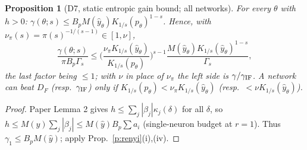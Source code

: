 \documentclass[11pt]{article}
\newtheorem{proposition}{Proposition}[section]\newtheorem{lemma}[proposition]{Lemma}\newtheorem{corollary}[proposition]{Corollary}
\theoremstyle{remark}\newtheorem{remark}[proposition]{Remark}
\begin{document}
\begin{proposition}[D7, static entropic gain bound; all networks]\label{p:gain}
For every $\theta$ with $h>0$: $\gamma(\theta;s)\le B_pM(\hat y_\theta)K_{1/s}(p_\theta)^{1-s}$. Hence, with $\nu_\pi(s)=\pi(s)^{-1/(s-1)}\in[1,\nu]$,
\[\frac{\gamma(\theta;s)}{\pi B_p\Gamma_s}\le\Big(\frac{\nu_\pi K_{1/s}(\hat y_\theta)}{K_{1/s}(p_\theta)}\Big)^{s-1}\frac{M(\hat y_\theta)K_{1/s}(\hat y_\theta)^{1-s}}{\Gamma_s},\]
the last factor being $\le1$; with $\nu$ in place of $\nu_\pi$ the left side is $\gamma/\gamma_{\rm IF}$. A network can beat $D_F$ (resp.\ $\gamma_{\rm IF}$) only if
$K_{1/s}(p_\theta)<\nu_\pi K_{1/s}(\hat y_\theta)$ (resp.\ $<\nu K_{1/s}(\hat y_\theta)$).
\end{proposition}
\begin{proof}
Paper Lemma 2 gives $h\le\sum_j|\beta_j|\kappa_j(\delta)$ for all $\delta$, so $h\le M(\hat y)\sum_j|\beta_j|\le M(\hat y)B_p\sum a_i$ (single-neuron budget at $r=1$).
Thus $\gamma_1\le B_pM(\hat y)$; apply Prop.~\ref{p:renyi}(i),(iv).
\end{proof}
\end{document}
